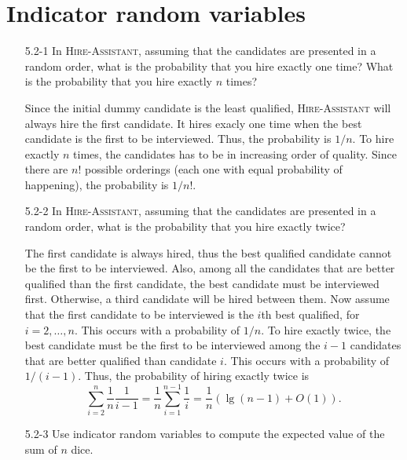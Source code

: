 \newpage

\section{Indicator random variables}

\begin{enumerate}

\item[5.2{-}1]{In \textsc{Hire-Assistant}, assuming that the candidates are
presented in a random order, what is the probability that you hire exactly
one time? What is the probability that you hire exactly $n$ times?}

\begin{framed}
Since the initial dummy candidate is the least qualified,
\textsc{Hire-Assistant} will always hire the first candidate. It hires exacly
one time when the best candidate is the first to be interviewed. Thus, the
probability is $1/n$. To hire exactly $n$ times, the candidates has to be in
increasing order of quality. Since there are $n!$ possible orderings (each one
with equal probability of happening), the probability is $1/n!$.
\end{framed}

\item[5.2{-}2]{In \textsc{Hire-Assistant}, assuming that the candidates are
presented in a random order, what is the probability that you hire exactly
twice?}

\begin{framed}
The first candidate is always hired, thus the best qualified candidate cannot be
the first to be interviewed. Also, among all the candidates that are better
qualified than the first candidate, the best candidate must be interviewed first.
Otherwise, a third candidate will be hired between them. Now assume that the
first candidate to be interviewed is the $i$th best qualified, for $i = 2,
\dots, n$. This occurs with a probability of $1/n$. To hire exactly twice, the
best candidate must be the first to be interviewed among the $i - 1$ candidates
that are better qualified than candidate $i$. This occurs with a probability
of $1/(i - 1)$. Thus, the probability of hiring exactly twice is
\[
  \sum_{i = 2}^{n} \frac{1}{n} \frac{1}{i - 1} = \frac{1}{n} \sum_{i = 1}^{n - 1} \frac{1}{i} = \frac{1}{n} (\lg(n - 1) + O(1)).
\]
\end{framed}

\item[5.2{-}3]{Use indicator random variables to compute the expected value of
the sum of $n$ dice.}


\end{enumerate}
